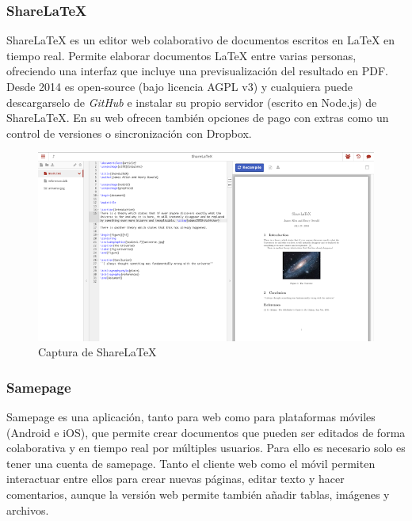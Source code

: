 	\subsubsection{ShareLaTeX}
	
	ShareLaTeX \cite{ref:shareLatex} es un editor web colaborativo de documentos escritos en LaTeX en tiempo real. Permite elaborar documentos LaTeX entre varias personas, ofreciendo una interfaz que incluye una previsualización del resultado en PDF. Desde 2014 es open-source (bajo licencia AGPL v3) y cualquiera puede descargarselo de \textit{GitHub} e instalar su propio servidor (escrito en Node.js) de ShareLaTeX. En su web ofrecen también opciones de pago con extras como un control de versiones o sincronización con Dropbox.
	
	\begin{figure}[H]
		\centering
			\includegraphics[keepaspectratio, scale=0.60]{Media/Captures/shareLatexWeb.png}
		\caption{Captura de ShareLaTeX}
		\label{fig:shareLaTeX}
	\end{figure}  
		
	\subsubsection{Samepage}
	
	Samepage \cite{ref:samepage} es una aplicación, tanto para web como para plataformas móviles (Android e iOS), que permite crear documentos que pueden ser editados de forma colaborativa y en tiempo real por múltiples usuarios. Para ello es necesario solo es tener una cuenta de samepage. Tanto el cliente web como el móvil permiten interactuar entre ellos para crear nuevas páginas, editar texto y hacer comentarios, aunque la versión web permite también añadir tablas, imágenes y archivos.
	
